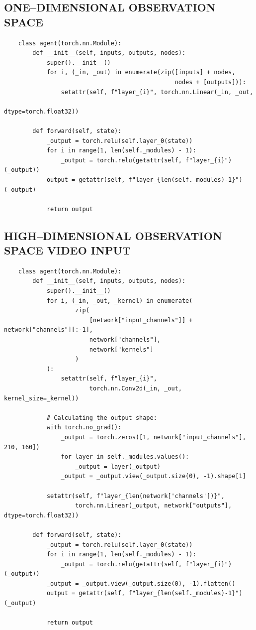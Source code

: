 \documentclass{article}
\renewenvironment{leftbar}[1][\hsize]{
    \def\FrameCommand{{\color{barcolor}\vrule width 0.5pt \hspace{10pt}}}
    \MakeFramed{\hsize#1 \advance\hsize-\width \FrameRestore}
}{\endMakeFramed}
\begin{document}
\subsection*{\normalsize ONE–DIMENSIONAL OBSERVATION SPACE}
\begin{leftbar}
    \begin{lstlisting}
    class agent(torch.nn.Module):
        def __init__(self, inputs, outputs, nodes):
            super().__init__()
            for i, (_in, _out) in enumerate(zip([inputs] + nodes,
                                                nodes + [outputs])):
                setattr(self, f"layer_{i}", torch.nn.Linear(_in, _out,
                                                            dtype=torch.float32))

        def forward(self, state):
            _output = torch.relu(self.layer_0(state))
            for i in range(1, len(self._modules) - 1):
                _output = torch.relu(getattr(self, f"layer_{i}")(_output))
            output = getattr(self, f"layer_{len(self._modules)-1}")(_output)

            return output
    \end{lstlisting}
\end{leftbar}
\subsection*{\normalsize HIGH–DIMENSIONAL OBSERVATION SPACE \hfill VIDEO INPUT}
\begin{leftbar}
    \begin{lstlisting}
    class agent(torch.nn.Module):
        def __init__(self, inputs, outputs, nodes):
            super().__init__()
            for i, (_in, _out, _kernel) in enumerate(
                    zip(
                        [network["input_channels"]] + network["channels"][:-1],
                        network["channels"],
                        network["kernels"]
                    )
            ):
                setattr(self, f"layer_{i}",
                        torch.nn.Conv2d(_in, _out, kernel_size=_kernel))

            # Calculating the output shape:
            with torch.no_grad():
                _output = torch.zeros([1, network["input_channels"], 210, 160])
                for layer in self._modules.values():
                    _output = layer(_output)
                _output = _output.view(_output.size(0), -1).shape[1]

            setattr(self, f"layer_{len(network['channels'])}",
                    torch.nn.Linear(_output, network["outputs"], dtype=torch.float32))

        def forward(self, state):
            _output = torch.relu(self.layer_0(state))
            for i in range(1, len(self._modules) - 1):
                _output = torch.relu(getattr(self, f"layer_{i}")(_output))
            _output = _output.view(_output.size(0), -1).flatten()
            output = getattr(self, f"layer_{len(self._modules)-1}")(_output)

            return output
    \end{lstlisting}
\end{leftbar}
\end{document}
